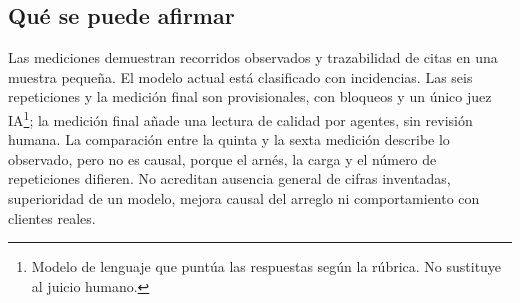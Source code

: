 \subsection{Qué se puede afirmar}\label{h-6}

Las mediciones demuestran recorridos observados y trazabilidad de citas en una muestra pequeña. El modelo actual está clasificado con incidencias. Las seis repeticiones y la medición final son provisionales, con bloqueos y un único juez IA\footnote{Modelo de lenguaje que puntúa las respuestas según la rúbrica. No sustituye al juicio humano.}; la medición final añade una lectura de calidad por agentes, sin revisión humana. La comparación entre la quinta y la sexta medición describe lo observado, pero no es causal, porque el arnés, la carga y el número de repeticiones difieren. No acreditan ausencia general de cifras inventadas, superioridad de un modelo, mejora causal del arreglo ni comportamiento con clientes reales. \cite{evaluacion}
